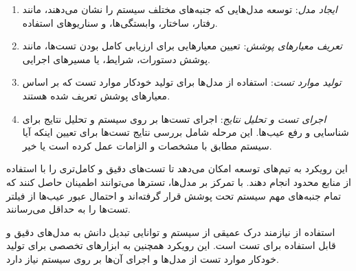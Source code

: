 \begin{enumerate}
	
\item \textit{ایجاد مدل}: توسعه مدل‌هایی که جنبه‌های مختلف سیستم را نشان می‌دهند، مانند رفتار، ساختار، وابستگی‌ها، و سناریوهای استفاده.\item \textit{تعریف معیارهای پوشش}: تعیین معیارهایی برای ارزیابی کامل بودن تست‌ها، مانند پوشش دستورات، شرایط، یا مسیرهای اجرایی.

\item \textit{تولید موارد تست}: استفاده از مدل‌ها برای تولید خودکار موارد تست که بر اساس معیارهای پوشش تعریف شده هستند.

\item \textit{اجرای تست و تحلیل نتایج}: اجرای تست‌ها بر روی سیستم و تحلیل نتایج برای شناسایی و رفع عیب‌ها. این مرحله شامل بررسی نتایج تست‌ها برای تعیین اینکه آیا سیستم مطابق با مشخصات و الزامات عمل کرده است یا خیر.

\end{enumerate}

این رویکرد به تیم‌های توسعه امکان می‌دهد تا تست‌های دقیق و کامل‌تری را با استفاده از منابع محدود انجام دهند. با تمرکز بر مدل‌ها، تسترها می‌توانند اطمینان حاصل کنند که تمام جنبه‌های مهم سیستم تحت پوشش قرار گرفته‌اند و احتمال عبور عیب‌ها از فیلتر تست‌ها را به حداقل می‌رسانند.

استفاده از 
نیازمند درک عمیقی از سیستم و توانایی تبدیل دانش به مدل‌های دقیق و قابل استفاده برای تست است. این رویکرد همچنین به ابزارهای تخصصی برای تولید خودکار موارد تست از مدل‌ها و اجرای آن‌ها بر روی سیستم نیاز دارد.
